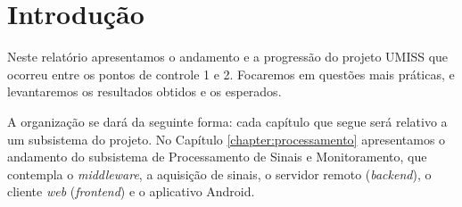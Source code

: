 \chapter{Introdução}

Neste relatório apresentamos o andamento e a progressão do projeto UMISS que
ocorreu entre os pontos de controle 1 e 2. Focaremos em questões mais práticas,
e levantaremos os resultados obtidos e os esperados.

A organização se dará da seguinte forma: cada capítulo que segue será relativo
a um subsistema do projeto. No Capítulo \ref{chapter:processamento}
apresentamos o andamento do subsistema de Processamento de Sinais e
Monitoramento, que contempla o \textit{middleware}, a aquisição de sinais, o
servidor remoto (\textit{backend}), o cliente \textit{web} (\textit{frontend})
e o aplicativo Android.

